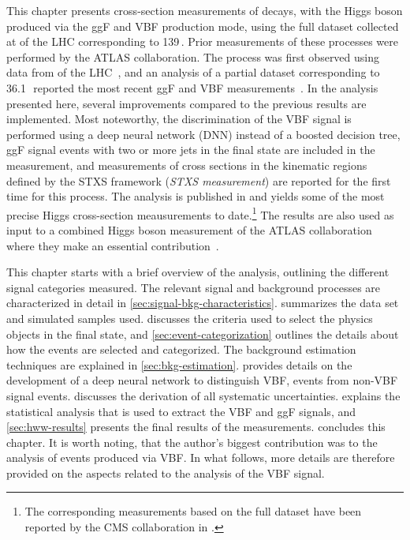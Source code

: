 This chapter presents cross-section measurements of \HWWdet decays, with the Higgs boson produced via the ggF and VBF production mode, using the full dataset collected at \RunTwo of the LHC corresponding to 139\,\ifb. 
Prior measurements of these processes were performed by the ATLAS collaboration. 
The \HWW process was first observed using data from \RunOne of the LHC~\cite{HIGG-2013-13}, and an analysis of a partial \RunTwo dataset corresponding to 36.1\,\ifb\ reported the most recent ggF and VBF \HWW measurements~\cite{HIGG-2013-13}.
In the analysis presented here, several improvements compared to the previous \RunTwo results are implemented. Most noteworthy, the discrimination of the VBF signal is performed using a deep neural network (DNN) instead of a boosted decision tree, ggF signal events with two or more jets in the final state are included in the measurement, and measurements of cross sections in the kinematic regions defined by the STXS framework (\emph{STXS measurement}) are reported for the first time for this process.
The analysis is published in  and yields some of the most precise Higgs cross-section meausurements to date.\footnote{The corresponding measurements based on the full \RunTwo dataset have been reported by the CMS collaboration in .}
The results are also used as input to a combined Higgs boson measurement of the ATLAS collaboration where they make an essential contribution~\cite{NaturePaper}.

This chapter starts with a brief overview of the analysis, outlining the different signal categories measured. 
The relevant signal and background processes are characterized in detail in \cref{sec:signal-bkg-characteristics}. 
 summarizes the data set and simulated samples used.
 discusses the criteria used to select the physics objects in the final state, and \cref{sec:event-categorization} outlines the details about how the events are selected and categorized. 
The background estimation techniques are explained in \cref{sec:bkg-estimation}. 
 provides details on the development of a deep neural network to distinguish VBF, \HWW events from non-VBF signal events. 
 discusses the derivation of all systematic uncertainties. 
 explains the statistical analysis that is used to extract the VBF and ggF signals, and \cref{sec:hww-results} presents the final results of the measurements.
 concludes this chapter.
It is worth noting, that the author's biggest contribution was to the analysis of \HWW events produced via VBF. In what follows, more details are therefore provided on the aspects related to the analysis of the VBF signal.

